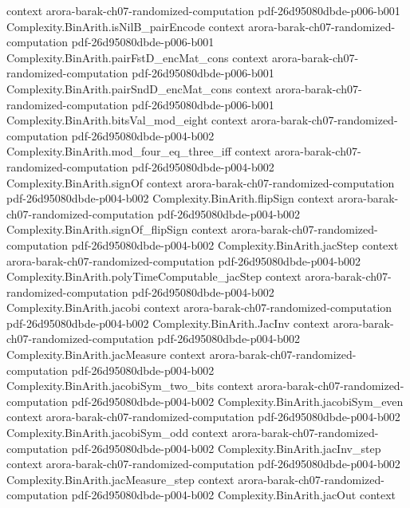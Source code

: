 \begin{theorem}
  {context}
  {arora-barak-ch07-randomized-computation}
  {pdf-26d95080dbde-p006-b001}
\proofstep
  {Complexity.BinArith.isNilB_pairEncode}
  {context}
  {arora-barak-ch07-randomized-computation}
  {pdf-26d95080dbde-p006-b001}
\proofstep
  {Complexity.BinArith.pairFstD_encMat_cons}
  {context}
  {arora-barak-ch07-randomized-computation}
  {pdf-26d95080dbde-p006-b001}
\proofstep
  {Complexity.BinArith.pairSndD_encMat_cons}
  {context}
  {arora-barak-ch07-randomized-computation}
  {pdf-26d95080dbde-p006-b001}
\proofstep
  {Complexity.BinArith.bitsVal_mod_eight}
  {context}
  {arora-barak-ch07-randomized-computation}
  {pdf-26d95080dbde-p004-b002}
\proofstep
  {Complexity.BinArith.mod_four_eq_three_iff}
  {context}
  {arora-barak-ch07-randomized-computation}
  {pdf-26d95080dbde-p004-b002}
\proofstep
  {Complexity.BinArith.signOf}
  {context}
  {arora-barak-ch07-randomized-computation}
  {pdf-26d95080dbde-p004-b002}
\proofstep
  {Complexity.BinArith.flipSign}
  {context}
  {arora-barak-ch07-randomized-computation}
  {pdf-26d95080dbde-p004-b002}
\proofstep
  {Complexity.BinArith.signOf_flipSign}
  {context}
  {arora-barak-ch07-randomized-computation}
  {pdf-26d95080dbde-p004-b002}
\proofstep
  {Complexity.BinArith.jacStep}
  {context}
  {arora-barak-ch07-randomized-computation}
  {pdf-26d95080dbde-p004-b002}
\proofstep
  {Complexity.BinArith.polyTimeComputable_jacStep}
  {context}
  {arora-barak-ch07-randomized-computation}
  {pdf-26d95080dbde-p004-b002}
\proofstep
  {Complexity.BinArith.jacobi}
  {context}
  {arora-barak-ch07-randomized-computation}
  {pdf-26d95080dbde-p004-b002}
\proofstep
  {Complexity.BinArith.JacInv}
  {context}
  {arora-barak-ch07-randomized-computation}
  {pdf-26d95080dbde-p004-b002}
\proofstep
  {Complexity.BinArith.jacMeasure}
  {context}
  {arora-barak-ch07-randomized-computation}
  {pdf-26d95080dbde-p004-b002}
\proofstep
  {Complexity.BinArith.jacobiSym_two_bits}
  {context}
  {arora-barak-ch07-randomized-computation}
  {pdf-26d95080dbde-p004-b002}
\proofstep
  {Complexity.BinArith.jacobiSym_even}
  {context}
  {arora-barak-ch07-randomized-computation}
  {pdf-26d95080dbde-p004-b002}
\proofstep
  {Complexity.BinArith.jacobiSym_odd}
  {context}
  {arora-barak-ch07-randomized-computation}
  {pdf-26d95080dbde-p004-b002}
\proofstep
  {Complexity.BinArith.jacInv_step}
  {context}
  {arora-barak-ch07-randomized-computation}
  {pdf-26d95080dbde-p004-b002}
\proofstep
  {Complexity.BinArith.jacMeasure_step}
  {context}
  {arora-barak-ch07-randomized-computation}
  {pdf-26d95080dbde-p004-b002}
\proofstep
  {Complexity.BinArith.jacOut}
  {context}

\end{theorem}
